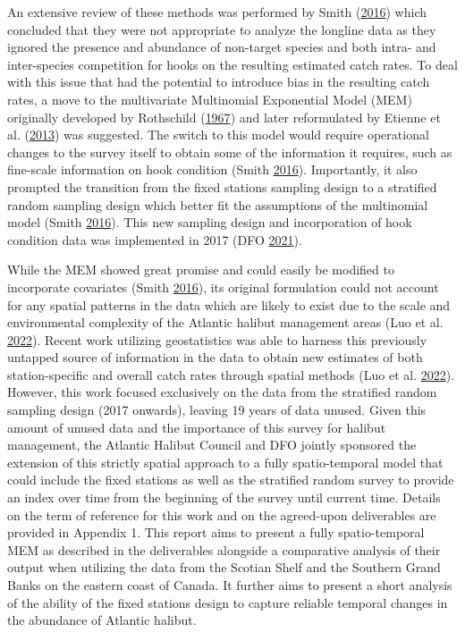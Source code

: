 \documentclass[12pt]{article}\usepackage[]{graphicx}\usepackage[]{color}
\begin{document}
An extensive review of these methods was performed by Smith (\protect\hyperlink{ref-Smith2016a}{2016}) which concluded that they were not appropriate to analyze the longline data as they ignored the presence and abundance of non-target species and both intra- and inter-species competition for hooks on the resulting estimated catch rates. To deal with this issue that had the potential to introduce bias in the resulting catch rates, a move to the multivariate Multinomial Exponential Model (MEM) originally developed by Rothschild (\protect\hyperlink{ref-Rothschild1967}{1967}) and later reformulated by Etienne et al. (\protect\hyperlink{ref-Etienne2013}{2013}) was suggested. The switch to this model would require operational changes to the survey itself to obtain some of the information it requires, such as fine-scale information on hook condition (Smith \protect\hyperlink{ref-Smith2016a}{2016}). Importantly, it also prompted the transition from the fixed stations sampling design to a stratified random sampling design which better fit the assumptions of the multinomial model (Smith \protect\hyperlink{ref-Smith2016a}{2016}). This new sampling design and incorporation of hook condition data was implemented in 2017 (DFO \protect\hyperlink{ref-DFO2021}{2021}).

While the MEM showed great promise and could easily be modified to incorporate covariates (Smith \protect\hyperlink{ref-Smith2016a}{2016}), its original formulation could not account for any spatial patterns in the data which are likely to exist due to the scale and environmental complexity of the Atlantic halibut management areas (Luo et al. \protect\hyperlink{ref-Luo2022}{2022}). Recent work utilizing geostatistics was able to harness this previously untapped source of information in the data to obtain new estimates of both station-specific and overall catch rates through spatial methods (Luo et al. \protect\hyperlink{ref-Luo2022}{2022}). However, this work focused exclusively on the data from the stratified random sampling design (2017 onwards), leaving 19 years of data unused. Given this amount of unused data and the importance of this survey for halibut management, the Atlantic Halibut Council and DFO jointly sponsored the extension of this strictly spatial approach to a fully spatio-temporal model that could include the fixed stations as well as the stratified random survey to provide an index over time from the beginning of the survey until current time. Details on the term of reference for this work and on the agreed-upon deliverables are provided in Appendix 1. This report aims to present a fully spatio-temporal MEM as described in the deliverables alongside a comparative analysis of their output when utilizing the data from the Scotian Shelf and the Southern Grand Banks on the eastern coast of Canada. It further aims to present a short analysis of the ability of the fixed stations design to capture reliable temporal changes in the abundance of Atlantic halibut.
\end{document}
